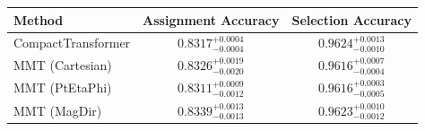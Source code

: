     \begin{tabular}{lcc}
        \toprule
        Method & Assignment Accuracy & Selection Accuracy \\
        \midrule
        CompactTransformer & $0.8317^{+0.0004}_{-0.0004}$ & $0.9624^{+0.0013}_{-0.0010}$ \\
        MMT (Cartesian) & $0.8326^{+0.0019}_{-0.0020}$ & $0.9616^{+0.0007}_{-0.0004}$ \\
        MMT (PtEtaPhi) & $0.8311^{+0.0009}_{-0.0012}$ & $0.9616^{+0.0003}_{-0.0005}$ \\
        MMT (MagDir) & $0.8339^{+0.0013}_{-0.0013}$ & $0.9623^{+0.0010}_{-0.0012}$ \\
        \bottomrule
    \end{tabular}